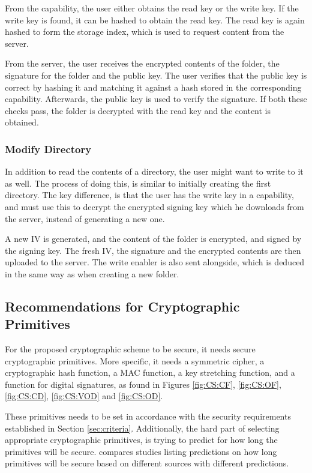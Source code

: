 \documentclass[pdftex,english,10pt,b5paper,twoside]{book}
\begin{document}
From the capability, the user either obtains the read key or the write key. If
the write key is found, it can be hashed to obtain the read key. The read key
is again hashed to form the storage index, which is used to request content
from the server.

From the server, the user receives the encrypted contents of the folder, the
signature for the folder and the public key. The user verifies that the public
key is correct by hashing it and matching it against a hash stored in the
corresponding capability. Afterwards, the public key is used to verify the
signature. If both these checks pass, the folder is decrypted with the
read key and the content is obtained.

\subsubsection{Modify Directory}

In addition to read the contents of a directory, the user might want to write
to it as well. The process of doing this, is similar to initially creating the
first directory. The key difference, is that the user has the write key in a
capability, and must use this to decrypt the encrypted signing key which he
downloads from the server, instead of generating a new one.

A new \ac{IV} is generated, and the content of the folder is encrypted, and
signed by the signing key. The fresh \ac{IV}, the signature and the encrypted
contents are then uploaded to the server. The write enabler is also sent
alongside, which is deduced in the same way as when creating a new folder.

\subsection{Recommendations for Cryptographic Primitives}
\label{sec:cryptoprimitivechoice}

For the proposed cryptographic scheme to be secure, it needs secure
cryptographic primitives. More specific, it needs a symmetric cipher, a
cryptographic hash function, a \ac{MAC} function, a key stretching function,
and a function for digital signatures, as found in Figures \ref{fig:CS:CF},
\ref{fig:CS:OF}, \ref{fig:CS:CD}, \ref{fig:CS:VOD} and \ref{fig:CS:OD}.

These primitives needs to be set in accordance with the security requirements
established in Section \ref{sec:criteria}. Additionally, the hard part of
selecting appropriate cryptographic primitives, is trying to predict for how
long the primitives will be secure. \citet{keylength} compares studies listing
predictions on how long primitives will be secure based on different sources
with different predictions.
\end{document}
